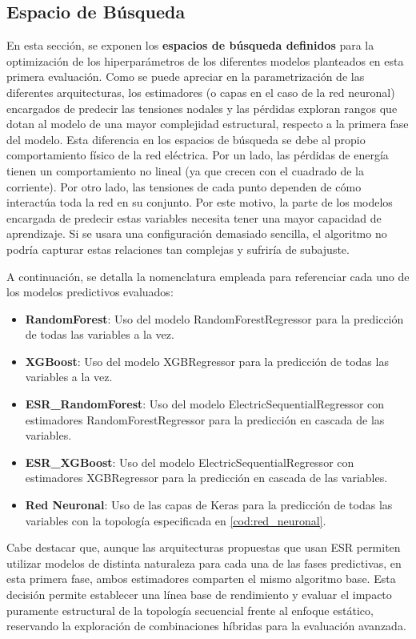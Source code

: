 \subsection{Espacio de Búsqueda}
En esta sección, se exponen los \textbf{espacios de búsqueda definidos} para la optimización de los hiperparámetros de los diferentes modelos planteados en esta primera evaluación. Como se puede apreciar en la parametrización de las diferentes arquitecturas, los estimadores (o capas en el caso de la red neuronal) encargados de predecir las tensiones nodales y las pérdidas exploran rangos que dotan al modelo de una mayor complejidad estructural, respecto a la primera fase del modelo. Esta diferencia en los espacios de búsqueda se debe al propio comportamiento físico de la red eléctrica. Por un lado, las pérdidas de energía tienen un comportamiento no lineal (ya que crecen con el cuadrado de la corriente). Por otro lado, las tensiones de cada punto dependen de cómo interactúa toda la red en su conjunto. Por este motivo, la parte de los modelos encargada de predecir estas variables necesita tener una mayor capacidad de aprendizaje. Si se usara una configuración demasiado sencilla, el algoritmo no podría capturar estas relaciones tan complejas y sufriría de subajuste.

A continuación, se detalla la nomenclatura empleada para referenciar cada uno de los modelos predictivos evaluados:
\begin{itemize}
	\item \textbf{RandomForest}: Uso del modelo RandomForestRegressor \cite{scikit-learn-random-forest} para la predicción de todas las variables a la vez.
	\item \textbf{XGBoost}: Uso del modelo XGBRegressor \cite{xgboost-xgbregressor} para la predicción de todas las variables a la vez.
	\item \textbf{ESR\_RandomForest}: Uso del modelo ElectricSequentialRegressor con estimadores RandomForestRegressor para la predicción en cascada de las variables.
	\item \textbf{ESR\_XGBoost}: Uso del modelo ElectricSequentialRegressor con estimadores XGBRegressor para la predicción en cascada de las variables.
	\item \textbf{Red Neuronal}: Uso de las capas de Keras \cite{keras-layers} para la predicción de todas las variables con la topología especificada en \ref{cod:red_neuronal}.
\end{itemize}

Cabe destacar que, aunque las arquitecturas propuestas que usan ESR permiten utilizar modelos de distinta naturaleza para cada una de las fases predictivas, en esta primera fase, ambos estimadores comparten el mismo algoritmo base. Esta decisión permite establecer una línea base de rendimiento y evaluar el impacto puramente estructural de la topología secuencial frente al enfoque estático, reservando la exploración de combinaciones híbridas para la evaluación avanzada.

